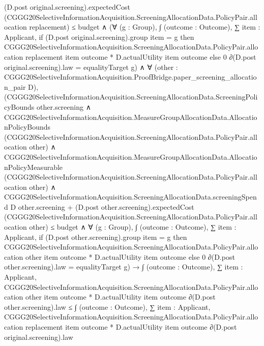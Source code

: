 \documentclass[10pt]{article}
\begin{document}
\begin{ReviewVerbatim}
                  (D.post original.screening).expectedCost
                    (CGGG20SelectiveInformationAcquisition.ScreeningAllocationData.PolicyPair.allocation replacement) ≤
                budget ∧
              (∀ (g : Group),
                  ∫ (outcome : Outcome),
                      ∑ item : Applicant,
                        if (D.post original.screening).group item = g then
                          CGGG20SelectiveInformationAcquisition.ScreeningAllocationData.PolicyPair.allocation
                              replacement item outcome *
                            D.actualUtility item outcome
                        else 0 ∂(D.post original.screening).law =
                    equalityTarget g) ∧
                ∀ (other : CGGG20SelectiveInformationAcquisition.ProofBridge.paper_screening_allocation_pair D),
                  (CGGG20SelectiveInformationAcquisition.ScreeningAllocationData.ScreeningPolicyBounds other.screening ∧
                      CGGG20SelectiveInformationAcquisition.MeasureGroupAllocationData.AllocationPolicyBounds
                          (CGGG20SelectiveInformationAcquisition.ScreeningAllocationData.PolicyPair.allocation other) ∧
                        CGGG20SelectiveInformationAcquisition.MeasureGroupAllocationData.AllocationPolicyMeasurable
                            (CGGG20SelectiveInformationAcquisition.ScreeningAllocationData.PolicyPair.allocation
                              other) ∧
                          CGGG20SelectiveInformationAcquisition.ScreeningAllocationData.screeningSpend D
                                  other.screening +
                                (D.post other.screening).expectedCost
                                  (CGGG20SelectiveInformationAcquisition.ScreeningAllocationData.PolicyPair.allocation
                                    other) ≤
                              budget ∧
                            ∀ (g : Group),
                              ∫ (outcome : Outcome),
                                  ∑ item : Applicant,
                                    if (D.post other.screening).group item = g then
                                      CGGG20SelectiveInformationAcquisition.ScreeningAllocationData.PolicyPair.allocation
                                          other item outcome *
                                        D.actualUtility item outcome
                                    else 0 ∂(D.post other.screening).law =
                                equalityTarget g) →
                    ∫ (outcome : Outcome),
                        ∑ item : Applicant,
                          CGGG20SelectiveInformationAcquisition.ScreeningAllocationData.PolicyPair.allocation other item
                              outcome *
                            D.actualUtility item outcome ∂(D.post other.screening).law ≤
                      ∫ (outcome : Outcome),
                        ∑ item : Applicant,
                          CGGG20SelectiveInformationAcquisition.ScreeningAllocationData.PolicyPair.allocation
                              replacement item outcome *
                            D.actualUtility item outcome ∂(D.post original.screening).law
\end{ReviewVerbatim}
\end{document}
